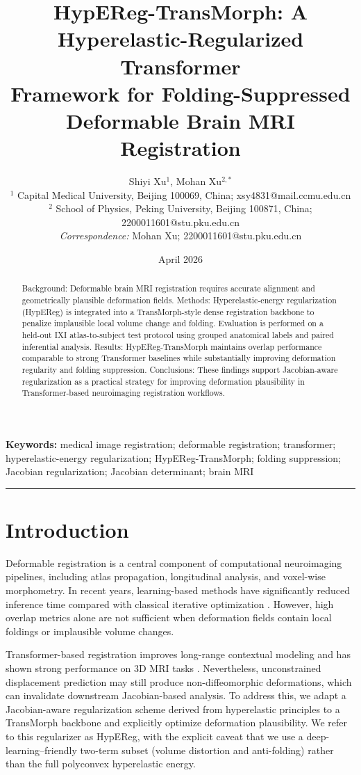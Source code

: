 \documentclass[11pt,a4paper]{article}
\title{HypEReg-TransMorph: A Hyperelastic-Regularized Transformer\\ Framework for Folding-Suppressed Deformable Brain MRI Registration}
\author{%
Shiyi Xu$^{1}$,
Mohan Xu$^{2,*}$\\[0.75em]
\small
$^{1}$ Capital Medical University, Beijing 100069, China; xsy4831@mail.ccmu.edu.cn\\
$^{2}$ School of Physics, Peking University, Beijing 100871, China; 2200011601@stu.pku.edu.cn\\[0.5em]
\small\textit{Correspondence:} Mohan Xu; 2200011601@stu.pku.edu.cn
}
\date{April 2026}
\begin{document}
\maketitle

\begin{abstract}
Background: Deformable brain MRI registration requires accurate alignment and geometrically plausible deformation fields. Methods: Hyperelastic-energy regularization (HypEReg) is integrated into a TransMorph-style dense registration backbone to penalize implausible local volume change and folding. Evaluation is performed on a held-out IXI atlas-to-subject test protocol using grouped anatomical labels and paired inferential analysis. Results: HypEReg-TransMorph maintains overlap performance comparable to strong Transformer baselines while substantially improving deformation regularity and folding suppression. Conclusions: These findings support Jacobian-aware regularization as a practical strategy for improving deformation plausibility in Transformer-based neuroimaging registration workflows.
\end{abstract}

\noindent\textbf{Keywords:} medical image registration; deformable registration; transformer; hyperelastic-energy regularization; HypEReg-TransMorph; folding suppression; Jacobian regularization; Jacobian determinant; brain MRI

\vspace{0.5em}
\hrule
\vspace{0.8em}


\section{Introduction}

Deformable registration is a central component of computational neuroimaging pipelines, including atlas propagation, longitudinal analysis, and voxel-wise morphometry. In recent years, learning-based methods have significantly reduced inference time compared with classical iterative optimization \citep{balakrishnan2019voxelmorph,kim2021cyclemorph}. However, high overlap metrics alone are not sufficient when deformation fields contain local foldings or implausible volume changes.

Transformer-based registration improves long-range contextual modeling and has shown strong performance on 3D MRI tasks \citep{chen2022transmorph}. Nevertheless, unconstrained displacement prediction may still produce non-diffeomorphic deformations, which can invalidate downstream Jacobian-based analysis. To address this, we adapt a Jacobian-aware regularization scheme derived from hyperelastic principles \citep{burger2013hyperelastic} to a TransMorph backbone and explicitly optimize deformation plausibility. We refer to this regularizer as HypEReg, with the explicit caveat that we use a deep-learning--friendly two-term subset (volume distortion and anti-folding) rather than the full polyconvex hyperelastic energy.
\end{document}
